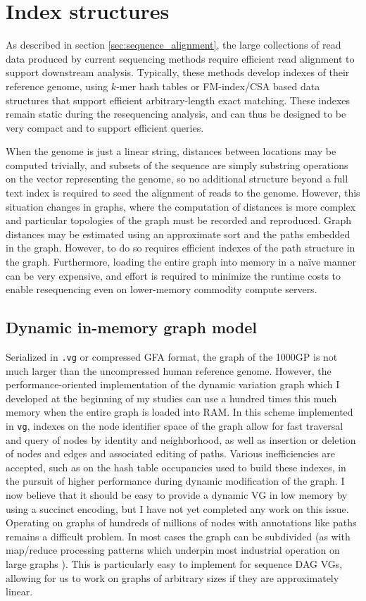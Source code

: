 \section{Index structures}
\label{sec:index_structures}

As described in section \ref{sec:sequence_alignment}, the large collections of read data produced by current sequencing methods require efficient read alignment to support downstream analysis.
Typically, these methods develop indexes of their reference genome, using $k$-mer hash tables or FM-index/CSA based data structures that support efficient arbitrary-length exact matching.
These indexes remain static during the resequencing analysis, and can thus be designed to be very compact and to support efficient queries.

When the genome is just a linear string, distances between locations may be computed trivially, and subsets of the sequence are simply substring operations on the vector representing the genome, so no additional structure beyond a full text index is required to seed the alignment of reads to the genome.
However, this situation changes in graphs, where the computation of distances is more complex and particular topologies of the graph must be recorded and reproduced.
Graph distances may be estimated using an approximate sort and the paths embedded in the graph.
However, to do so requires efficient indexes of the path structure in the graph.
Furthermore, loading the entire graph into memory in a na\"{i}ve manner can be very expensive, and effort is required to minimize the runtime costs to enable resequencing even on lower-memory commodity compute servers.

\subsection{Dynamic in-memory graph model}

Serialized in {\tt .vg} or compressed GFA format, the graph of the 1000GP is not much larger than the uncompressed human reference genome.
However, the performance-oriented implementation of the dynamic variation graph which I developed at the beginning of my studies can use a hundred times this much memory when the entire graph is loaded into RAM.
In this scheme implemented in {\tt vg}, indexes on the node identifier space of the graph allow for fast traversal and query of nodes by identity and neighborhood, as well as insertion or deletion of nodes and edges and associated editing of paths.
Various inefficiencies are accepted, such as on the hash table occupancies used to build these indexes, in the pursuit of higher performance during dynamic modification of the graph.
I now believe that it should be easy to provide a dynamic VG in low memory by using a succinct encoding, but I have not yet completed any work on this issue.
Operating on graphs of hundreds of millions of nodes with annotations like paths remains a difficult problem.
In most cases the graph can be subdivided (as with map/reduce processing patterns \cite{dean2008mapreduce} which underpin most industrial operation on large graphs \cite{cohen2009graph}).
This is particularly easy to implement for sequence DAG VGs, allowing for us to work on graphs of arbitrary sizes if they are approximately linear.

